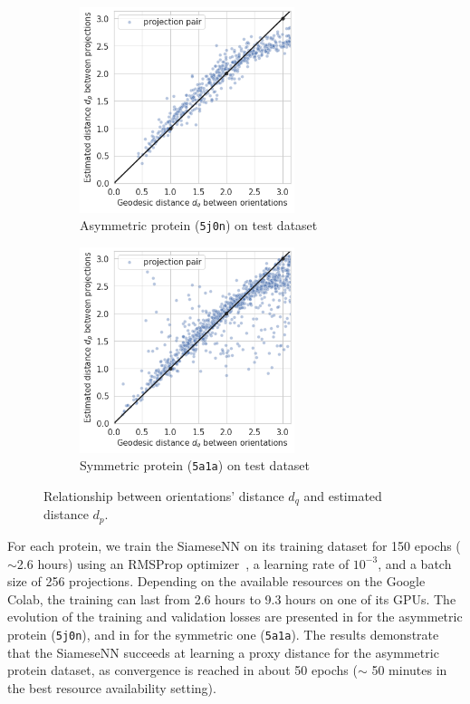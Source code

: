 \begin{figure}
    \centering
    \begin{subfigure}[b]{0.45\textwidth}
        \includegraphics[height=6cm]{images/dPdQ_5j0n.png}
        \caption{Asymmetric protein (\texttt{5j0n}) on test dataset}
    \end{subfigure}
    \hfill
    \begin{subfigure}[b]{0.50\textwidth}
    \centering
        \includegraphics[height=6cm]{images/dPdQ_5a1a.png}
        \caption{Symmetric protein (\texttt{5a1a}) on test dataset}
    \end{subfigure}
    \caption{Relationship between orientations' distance $d_q$ and estimated distance $d_p$.}
    \label{fig:learned-distance-siamese}
\end{figure}


For each protein, we train the SiameseNN on its training dataset for 150 epochs ($\sim$2.6 hours) using an RMSProp optimizer~\cite{noauthor_tfkerasoptimizersrmsprop_nodate}, a learning rate of $10^{-3}$, and a batch size of 256 projections.
Depending on the available resources on the Google Colab, the training can last from 2.6 hours to 9.3 hours on one of its GPUs.
The evolution of the training and validation losses are presented in  for the asymmetric protein (\texttt{5j0n}), and in  for the symmetric one (\texttt{5a1a}).
The results demonstrate that the SiameseNN succeeds at learning a proxy distance for the asymmetric protein dataset, as convergence is reached in about 50 epochs ($\sim$ 50 minutes in the best resource availability setting).

